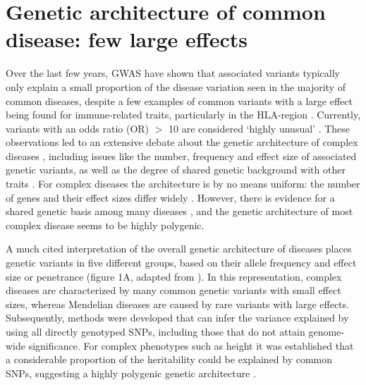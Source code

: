 \section{Genetic architecture of common disease: few large effects}
Over the last few years, GWAS have shown that associated variants typically only explain a small proportion of the disease variation seen in the majority of common diseases, despite a few examples of common variants with a large effect being found for immune-related traits, particularly in the HLA-region \cite{dalyHLAB5701Genotype2009}. Currently, variants with an odds ratio (OR) $>$ 10 are considered ‘highly unusual’ \cite{mccarthyGenomewideAssociationStudies2008}. These observations led to an extensive debate about the genetic architecture of complex diseases \cite{mccarthyGenomewideAssociationStudies2008,hansenEvolutionGeneticArchitecture2006,devlinGeneticArchitectureAutism2012,lohContrastingGeneticArchitectures2015,fuchsbergerGeneticArchitectureType2016}, including issues like the number, frequency and effect size of associated genetic variants, as well as the degree of shared genetic background with other traits \cite{mackayGeneticArchitectureQuantitative2001}. For complex diseases the architecture is by no means uniform: the number of genes and their effect sizes differ widely \cite{lohContrastingGeneticArchitectures2015,fuchsbergerGeneticArchitectureType2016,HiddenComplexityMendelian,rheenenGenomewideAssociationAnalyses2016}. However, there is evidence for a shared genetic basis among many diseases \cite{zhernakovaDetectingSharedPathogenesis2009,pickrellDetectionInterpretationShared2016,shiContrastingGeneticArchitecture2016}, and the genetic architecture of most complex disease seems to be highly polygenic.

A much cited interpretation of the overall genetic architecture of diseases places genetic variants in five different groups, based on their allele frequency and effect size or penetrance (figure 1A, adapted from \cite{mccarthyGenomewideAssociationStudies2008,manolioFindingMissingHeritability2009}). In this representation, complex diseases are characterized by many common genetic variants with small effect sizes, whereas Mendelian diseases are caused by rare variants with large effects. Subsequently, methods were developed that can infer the variance explained by using all directly genotyped SNPs, including those that do not attain genome-wide significance. For complex phenotypes such as height it was established that a considerable proportion of the heritability could be explained by common SNPs, suggesting a highly polygenic genetic architecture \cite{yangCommonSNPsExplain2010}.

